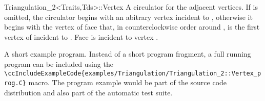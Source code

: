 \begin{ccRefClass}{Triangulation_2<Traits,Tds>::Vertex}
{A circulator for the adjacent vertices.
If  is omitted, the circulator begins with
 an abitrary vertex incident
to , otherwise it begins with the
vertex of face  that, 
in counterclockwise order around ,
is the first vertex of  incident to .
\ccPrecond Face  is incident to vertex .}


\ccSeeAlso
{}


\ccExample

A short example program.
Instead of a short program fragment, a full running program can be
included using the 
\verb|\ccIncludeExampleCode{examples/Triangulation/Triangulation_2::Vertex_prog.C}| 
macro. The program example would be part of the source code distribution and
also part of the automatic test suite.



\end{ccRefClass}


